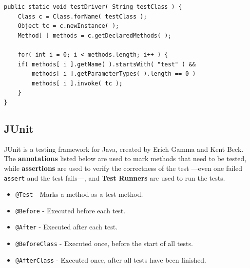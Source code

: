 \begin{lstlisting}
public static void testDriver( String testClass ) {
    Class c = Class.forName( testClass );
    Object tc = c.newInstance( );
    Method[ ] methods = c.getDeclaredMethods( );

    for( int i = 0; i < methods.length; i++ ) {
    if( methods[ i ].getName( ).startsWith( "test" ) &&
        methods[ i ].getParameterTypes( ).length == 0 )
        methods[ i ].invoke( tc );
    }
}
\end{lstlisting}

\subsection{JUnit}
JUnit is a testing framework for Java, created by Erich Gamma and Kent Beck.
The \textbf{annotations} listed below are used to mark methods that need to be tested, while \textbf{assertions} are used to verify the correctness of the test ---even one failed \lstinline|assert| and the test fails---, and \textbf{Test Runners} are used to run the tests.

\begin{itemize}
    \item \lstinline|@Test| - Marks a method as a test method.
    \item \lstinline|@Before| - Executed before each test.
    \item \lstinline|@After| - Executed after each test.
    \item \lstinline|@BeforeClass| - Executed once, before the start of all tests.
    \item \lstinline|@AfterClass| - Executed once, after all tests have been finished.
\end{itemize}

